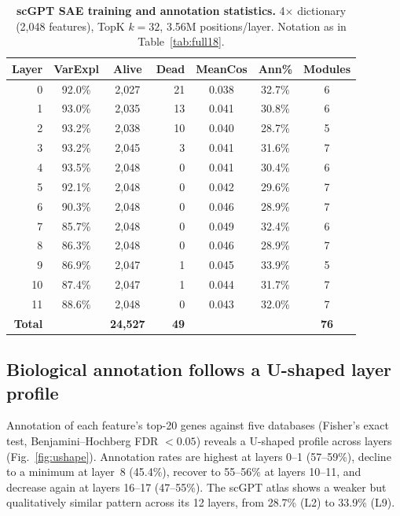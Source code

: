 \documentclass[onecolumn,11pt]{article}
\begin{document}
\begin{table}[t]
\centering
\caption{\textbf{scGPT SAE training and annotation statistics.} 4$\times$ dictionary (2,048 features), TopK $k{=}32$, 3.56M positions/layer. Notation as in Table~\ref{tab:full18}.}
\label{tab:scgpt_full12}
\smallskip
\begin{tabular}{rccrccc}
\toprule
Layer & VarExpl & Alive & Dead & MeanCos & Ann\% & Modules \\
\midrule
0  & 92.0\% & 2,027 & 21 & 0.038 & 32.7\% & 6 \\
1  & 93.0\% & 2,035 & 13 & 0.041 & 30.8\% & 6 \\
2  & 93.2\% & 2,038 & 10 & 0.040 & 28.7\% & 5 \\
3  & 93.2\% & 2,045 & 3  & 0.041 & 31.6\% & 7 \\
4  & 93.5\% & 2,048 & 0  & 0.041 & 30.4\% & 6 \\
5  & 92.1\% & 2,048 & 0  & 0.042 & 29.6\% & 7 \\
6  & 90.3\% & 2,048 & 0  & 0.046 & 28.9\% & 7 \\
7  & 85.7\% & 2,048 & 0  & 0.049 & 32.4\% & 6 \\
8  & 86.3\% & 2,048 & 0  & 0.046 & 28.9\% & 7 \\
9  & 86.9\% & 2,047 & 1  & 0.045 & 33.9\% & 5 \\
10 & 87.4\% & 2,047 & 1  & 0.044 & 31.7\% & 7 \\
11 & 88.6\% & 2,048 & 0  & 0.043 & 32.0\% & 7 \\
\midrule
\textbf{Total} & & \textbf{24,527} & \textbf{49} & & & \textbf{76} \\
\bottomrule
\end{tabular}
\end{table}

\subsection*{Biological annotation follows a U-shaped layer profile}
\label{sec:ushape}

Annotation of each feature's top-20 genes against five databases (Fisher's exact test,
Benjamini--Hochberg FDR $< 0.05$) reveals a U-shaped profile across layers
(Fig.~\ref{fig:ushape}). Annotation rates are highest at layers 0--1 (57--59\%), decline to a
minimum at layer~8 (45.4\%), recover to 55--56\% at layers 10--11, and decrease again at layers
16--17 (47--55\%). The scGPT atlas shows a weaker but qualitatively similar pattern across its 12
layers, from 28.7\% (L2) to 33.9\% (L9).
\end{document}
